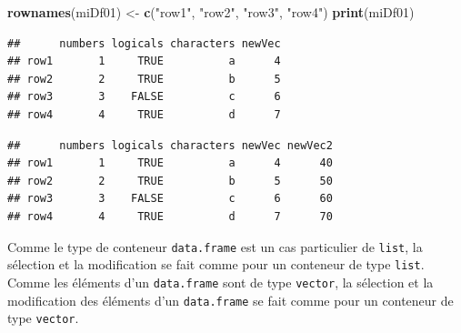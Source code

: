 \documentclass[]{book}
\newenvironment{Shaded}{\begin{snugshade}}{\end{snugshade}}
\newcommand{\KeywordTok}[1]{\textcolor[rgb]{0.13,0.29,0.53}{\textbf{#1}}}
\newcommand{\DecValTok}[1]{\textcolor[rgb]{0.00,0.00,0.81}{#1}}
\newcommand{\StringTok}[1]{\textcolor[rgb]{0.31,0.60,0.02}{#1}}
\newcommand{\OperatorTok}[1]{\textcolor[rgb]{0.81,0.36,0.00}{\textbf{#1}}}
\newcommand{\NormalTok}[1]{#1}
\begin{document}
\begin{Shaded}
\begin{Highlighting}[]
\KeywordTok{rownames}\NormalTok{(miDf01) <-}\StringTok{ }\KeywordTok{c}\NormalTok{(}\StringTok{"row1"}\NormalTok{, }\StringTok{"row2"}\NormalTok{, }\StringTok{"row3"}\NormalTok{, }\StringTok{"row4"}\NormalTok{)}
\KeywordTok{print}\NormalTok{(miDf01)}
\end{Highlighting}
\end{Shaded}

\begin{verbatim}
##      numbers logicals characters newVec
## row1       1     TRUE          a      4
## row2       2     TRUE          b      5
## row3       3    FALSE          c      6
## row4       4     TRUE          d      7
\end{verbatim}

\begin{Shaded}
\end{Shaded}

\begin{verbatim}
##      numbers logicals characters newVec newVec2
## row1       1     TRUE          a      4      40
## row2       2     TRUE          b      5      50
## row3       3    FALSE          c      6      60
## row4       4     TRUE          d      7      70
\end{verbatim}

Comme le type de conteneur \texttt{data.frame} est un cas particulier de
\texttt{list}, la sélection et la modification se fait comme pour un
conteneur de type \texttt{list}. Comme les éléments d'un
\texttt{data.frame} sont de type \texttt{vector}, la sélection et la
modification des éléments d'un \texttt{data.frame} se fait comme pour un
conteneur de type \texttt{vector}.

\begin{Shaded}
\end{Shaded}
\end{document}
